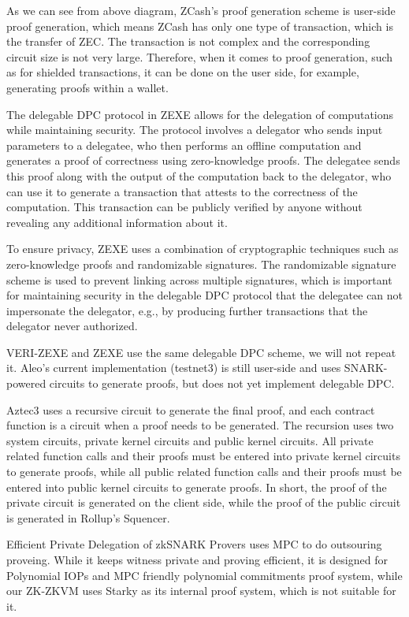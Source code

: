 As we can see from above diagram, ZCash's proof generation scheme is user-side proof generation, which means ZCash has only one type of transaction, which is the transfer of ZEC. The transaction is not complex and the corresponding circuit size is not very large. Therefore, when it comes to proof generation, such as for shielded transactions, it can be done on the user side, for example, generating proofs within a wallet.

The delegable DPC protocol in ZEXE \cite{cryptoeprint:2018/962} allows for the delegation of computations while maintaining security. The protocol involves a delegator who sends input parameters to a delegatee, who then performs an offline computation and generates a proof of correctness using zero-knowledge proofs. The delegatee sends this proof along with the output of the computation back to the delegator, who can use it to generate a transaction that attests to the correctness of the computation. This transaction can be publicly verified by anyone without revealing any additional information about it.

To ensure privacy, ZEXE uses a combination of cryptographic techniques such as zero-knowledge proofs and randomizable signatures. The randomizable signature scheme is used to prevent linking across multiple signatures, which is important for maintaining security in the delegable DPC protocol that the delegatee can not impersonate the delegator, e.g., by producing further transactions that the delegator never authorized.

VERI-ZEXE and ZEXE use the same delegable DPC scheme, we will not repeat it. Aleo's current implementation (testnet3) is still user-side and uses SNARK-powered circuits to generate proofs, but does not yet implement delegable DPC.

Aztec3 \cite{website:Aztec3} uses a recursive circuit to generate the final proof, and each contract function is a circuit when a proof needs to be generated. The recursion uses two system circuits, private kernel circuits and public kernel circuits. All private related function calls and their proofs must be entered into private kernel circuits to generate proofs, while all public related function calls and their proofs must be entered into public kernel circuits to generate proofs. In short, the proof of the private circuit is generated on the client side, while the proof of the public circuit is generated in Rollup's Squencer.

Efficient Private Delegation of zkSNARK Provers \cite{website:epdzp} uses MPC to do outsouring proveing. While it keeps witness private and proving efficient, it is designed for Polynomial IOPs and MPC friendly polynomial commitments proof system, while our ZK-ZKVM uses Starky as its internal proof system, which is not suitable for it.

